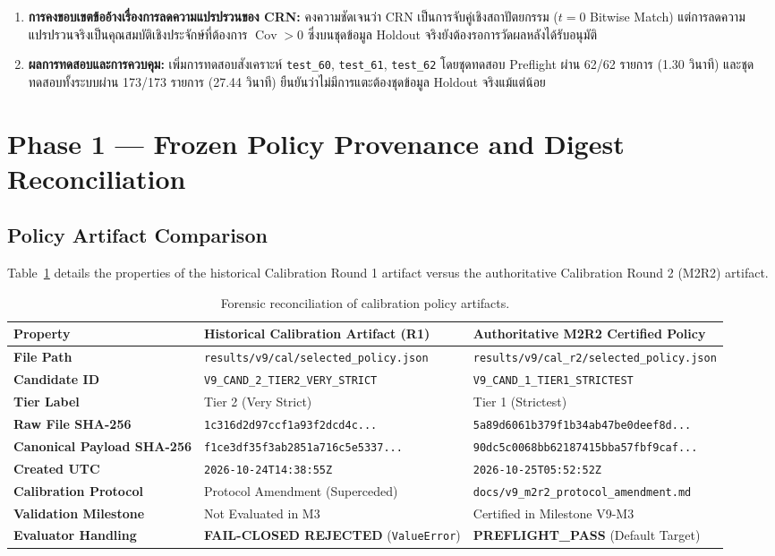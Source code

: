 \documentclass[10pt,a4paper]{article}
\begin{document}
\begin{enumerate}
    \item \textbf{\thaifont การคงขอบเขตข้ออ้างเรื่องการลดความแปรปรวนของ CRN:} {\thaifont คงความชัดเจนว่า CRN เป็นการจับคู่เชิงสถาปัตยกรรม ($t=0$ Bitwise Match) แต่การลดความแปรปรวนจริงเป็นคุณสมบัติเชิงประจักษ์ที่ต้องการ $\operatorname{Cov} > 0$ ซึ่งบนชุดข้อมูล Holdout จริงยังต้องรอการวัดผลหลังได้รับอนุมัติ}
    \item \textbf{\thaifont ผลการทดสอบและการควบคุม:} {\thaifont เพิ่มการทดสอบสังเคราะห์ \texttt{test\_60}, \texttt{test\_61}, \texttt{test\_62} โดยชุดทดสอบ Preflight ผ่าน 62/62 รายการ (1.30 วินาที) และชุดทดสอบทั้งระบบผ่าน 173/173 รายการ (27.44 วินาที) ยืนยันว่าไม่มีการแตะต้องชุดข้อมูล Holdout จริงแม้แต่น้อย}
\end{enumerate}

\section{Phase 1 --- Frozen Policy Provenance and Digest Reconciliation}

\subsection{Policy Artifact Comparison}
Table~\ref{tab:policy_artifacts} details the properties of the historical Calibration Round 1 artifact versus the authoritative Calibration Round 2 (M2R2) artifact.

\begin{table}[htbp]
\centering
\small
\begin{tabularx}{\textwidth}{lXX}
\toprule
\textbf{Property} & \textbf{Historical Calibration Artifact (R1)} & \textbf{Authoritative M2R2 Certified Policy} \\
\midrule
\textbf{File Path} & \texttt{results/v9/cal/selected\_policy.json} & \texttt{results/v9/cal\_r2/selected\_policy.json} \\
\textbf{Candidate ID} & \texttt{V9\_CAND\_2\_TIER2\_VERY\_STRICT} & \texttt{V9\_CAND\_1\_TIER1\_STRICTEST} \\
\textbf{Tier Label} & Tier 2 (Very Strict) & Tier 1 (Strictest) \\
\textbf{Raw File SHA-256} & \texttt{1c316d2d97ccf1a93f2dcd4c...} & \texttt{5a89d6061b379f1b34ab47be0deef8d...} \\
\textbf{Canonical Payload SHA-256} & \texttt{f1ce3df35f3ab2851a716c5e5337...} & \texttt{90dc5c0068bb62187415bba57fbf9caf...} \\
\textbf{Created UTC} & \texttt{2026-10-24T14:38:55Z} & \texttt{2026-10-25T05:52:52Z} \\
\textbf{Calibration Protocol} & Protocol Amendment (Superceded) & \texttt{docs/v9\_m2r2\_protocol\_amendment.md} \\
\textbf{Validation Milestone} & Not Evaluated in M3 & Certified in Milestone V9-M3 \\
\textbf{Evaluator Handling} & \textbf{FAIL-CLOSED REJECTED} (\texttt{ValueError}) & \textbf{PREFLIGHT\_PASS} (Default Target) \\
\bottomrule
\end{tabularx}
\caption{Forensic reconciliation of calibration policy artifacts.}
\label{tab:policy_artifacts}
\end{table}
\end{document}
